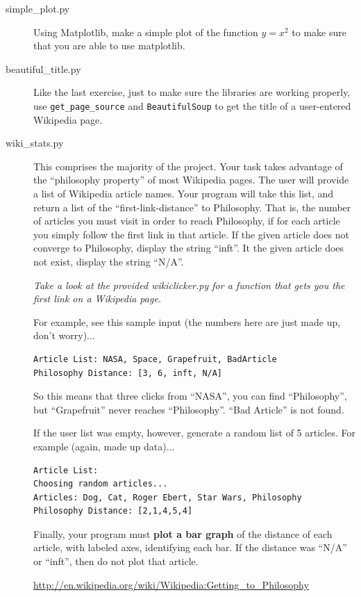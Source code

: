 \documentclass[11pt]{cselabheader}
\begin{document}
\begin{description}
  \item[simple\_plot.py] Using Matplotlib, make a simple plot of the function
    $y = x^2$ to make sure that you are able to use matplotlib.

  \item[beautiful\_title.py] Like the last exercise, just to make sure the
    libraries are working properly, use \texttt{get\_page\_source} and
    \texttt{BeautifulSoup} to get the title of a user-entered Wikipedia page.

  \item[wiki\_stats.py] This comprises the majority of the project. Your task
    takes advantage of the ``philosophy property'' of most Wikipedia pages. The
    user will provide a list of Wikipedia article names. Your program will take
    this list, and return a list of the ``first-link-distance'' to Philosophy.
    That is, the number of articles you must visit in order to reach Philosophy,
    if for each article you simply follow the first link in that article.
    If the given article does not converge to Philosophy, display the string
    ``inft''.  It the given article does not exist, display the string ``N/A''.

    \emph{Take a look at the provided wikiclicker.py for a function that gets
    you the first link on a Wikipedia page.}

    For example, see this sample input (the numbers here are just made up, don't
    worry)...
    \begin{lstlisting}[style=bash]
Article List: NASA, Space, Grapefruit, BadArticle
Philosophy Distance: [3, 6, inft, N/A]
    \end{lstlisting}
    So this means that three clicks from ``NASA'', you can find ``Philosophy'',
    but ``Grapefruit'' never reaches ``Philosophy''. ``Bad Article'' is not
    found.

    If the user list was empty, however, generate a random list of 5 articles.
    For example (again, made up data)...
    \begin{lstlisting}[style=bash]
Article List:
Choosing random articles...
Articles: Dog, Cat, Roger Ebert, Star Wars, Philosophy
Philosophy Distance: [2,1,4,5,4]
    \end{lstlisting}

    Finally, your program must \textbf{plot a bar graph} of the distance of each
    article, with labeled axes, identifying each bar. If the distance was
    ``N/A'' or ``inft'', then do not plot that article.

    \begin{center}
      \url{http://en.wikipedia.org/wiki/Wikipedia:Getting_to_Philosophy}
    \end{center}

\end{description}
\end{document}
